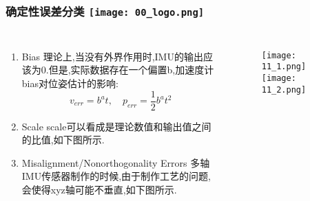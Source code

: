 \begin{frame}
  \frametitle{确定性误差分类 \hfill \texttt{[image: 00\_logo.png]}}
  \begin{columns}
    
    \begin{enumerate}
      \item Bias \quad 理论上,当没有外界作用时,IMU的输出应该为0.但是,实际数据存在一个偏置b,加速度计bias对位姿估计的影响:
      \begin{equation}
        v_{err} = b^a t,\quad p_{err} = \frac{1}{2} b^a t^2        
      \end{equation}

      \item Scale \quad scale可以看成是理论数值和输出值之间的比值,如下图所示.
      \item Misalignment/Nonorthogonality Errors \quad 
      多轴IMU传感器制作的时候,由于制作工艺的问题,会使得xyz轴可能不垂直,如下图所示.

    \end{enumerate}

    \begin{figure}[h]
      \texttt{[image: 11\_1.png]}
      \qquad
      \texttt{[image: 11\_2.png]}

    \end{figure}
    
  
  \end{columns}
  \end{frame}   

